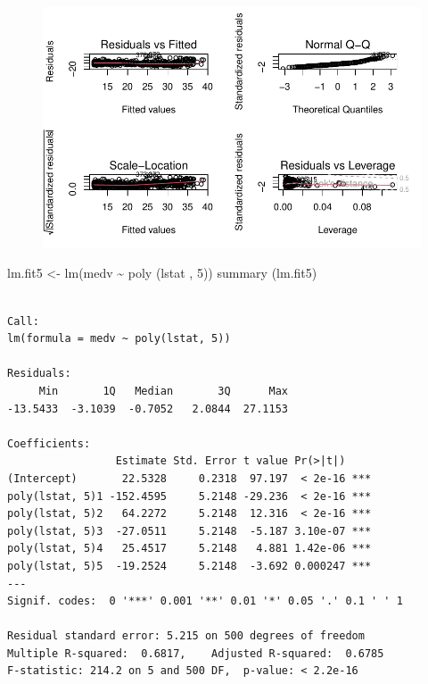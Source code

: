 \documentclass[
  letterpaper,
  DIV=11,
  numbers=noendperiod]{scrartcl}
\newenvironment{Shaded}{\begin{snugshade}}{\end{snugshade}}
\newcommand{\DecValTok}[1]{\textcolor[rgb]{0.68,0.00,0.00}{#1}}
\newcommand{\FunctionTok}[1]{\textcolor[rgb]{0.28,0.35,0.67}{#1}}
\newcommand{\NormalTok}[1]{\textcolor[rgb]{0.00,0.23,0.31}{#1}}
\newcommand{\OtherTok}[1]{\textcolor[rgb]{0.00,0.23,0.31}{#1}}
\newcommand{\SpecialCharTok}[1]{\textcolor[rgb]{0.37,0.37,0.37}{#1}}
\begin{document}
\begin{figure}[H]

{\centering \includegraphics{Regresion-lineal-simple-y-multiple_files/figure-pdf/unnamed-chunk-24-1.pdf}

}

\end{figure}

\begin{Shaded}
\begin{Highlighting}[]
\NormalTok{lm.fit5 }\OtherTok{\textless{}{-}} \FunctionTok{lm}\NormalTok{(medv }\SpecialCharTok{\textasciitilde{}} \FunctionTok{poly}\NormalTok{ (lstat , }\DecValTok{5}\NormalTok{))}
\FunctionTok{summary}\NormalTok{ (lm.fit5)}
\end{Highlighting}
\end{Shaded}

\begin{verbatim}

Call:
lm(formula = medv ~ poly(lstat, 5))

Residuals:
     Min       1Q   Median       3Q      Max 
-13.5433  -3.1039  -0.7052   2.0844  27.1153 

Coefficients:
                 Estimate Std. Error t value Pr(>|t|)    
(Intercept)       22.5328     0.2318  97.197  < 2e-16 ***
poly(lstat, 5)1 -152.4595     5.2148 -29.236  < 2e-16 ***
poly(lstat, 5)2   64.2272     5.2148  12.316  < 2e-16 ***
poly(lstat, 5)3  -27.0511     5.2148  -5.187 3.10e-07 ***
poly(lstat, 5)4   25.4517     5.2148   4.881 1.42e-06 ***
poly(lstat, 5)5  -19.2524     5.2148  -3.692 0.000247 ***
---
Signif. codes:  0 '***' 0.001 '**' 0.01 '*' 0.05 '.' 0.1 ' ' 1

Residual standard error: 5.215 on 500 degrees of freedom
Multiple R-squared:  0.6817,    Adjusted R-squared:  0.6785 
F-statistic: 214.2 on 5 and 500 DF,  p-value: < 2.2e-16
\end{verbatim}
\end{document}
